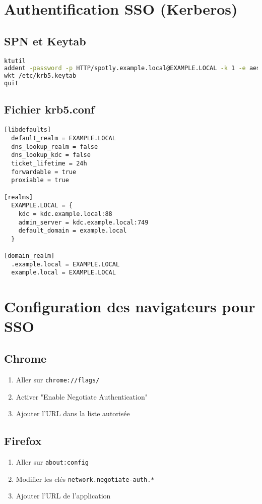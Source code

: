 \documentclass[a4paper,12pt]{article}
\begin{document}
\section{Authentification SSO (Kerberos)}
\subsection{SPN et Keytab}
\begin{lstlisting}[language=bash]
ktutil
addent -password -p HTTP/spotly.example.local@EXAMPLE.LOCAL -k 1 -e aes256-cts-hmac-sha1-96
wkt /etc/krb5.keytab
quit
\end{lstlisting}

\subsection{Fichier krb5.conf}
\begin{lstlisting}
[libdefaults]
  default_realm = EXAMPLE.LOCAL
  dns_lookup_realm = false
  dns_lookup_kdc = false
  ticket_lifetime = 24h
  forwardable = true
  proxiable = true

[realms]
  EXAMPLE.LOCAL = {
    kdc = kdc.example.local:88
    admin_server = kdc.example.local:749
    default_domain = example.local
  }

[domain_realm]
  .example.local = EXAMPLE.LOCAL
  example.local = EXAMPLE.LOCAL
\end{lstlisting}

\section{Configuration des navigateurs pour SSO}
\subsection{Chrome}
\begin{enumerate}
    \item Aller sur \texttt{chrome://flags/}
    \item Activer "Enable Negotiate Authentication"
    \item Ajouter l'URL dans la liste autorisée
\end{enumerate}

\subsection{Firefox}
\begin{enumerate}
    \item Aller sur \texttt{about:config}
    \item Modifier les clés \texttt{network.negotiate-auth.*}
    \item Ajouter l'URL de l'application
\end{enumerate}
\end{document}
